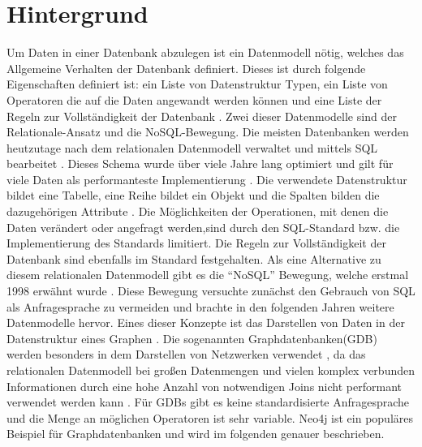
\chapter{Hintergrund} %

\label{Chapter0} %


\newcommand{\keyword}[1]{\textit{#1}}
\newcommand{\tabhead}[1]{\textbf{#1}}
\newcommand{\code}[1]{\texttt{#1}}
\newcommand{\file}[1]{\texttt{\bfseries#1}}
\newcommand{\option}[1]{\texttt{\itshape#1}}

Um Daten in einer Datenbank abzulegen ist ein Datenmodell nötig, welches  das Allgemeine Verhalten der Datenbank definiert. Dieses ist durch folgende Eigenschaften definiert ist: ein Liste von Datenstruktur Typen, ein Liste von Operatoren die auf die Daten angewandt werden können und eine Liste der Regeln zur Vollständigkeit der Datenbank \parencite{codd1981data}. Zwei dieser Datenmodelle sind der Relationale-Ansatz und die NoSQL-Bewegung. Die meisten Datenbanken werden heutzutage nach dem relationalen Datenmodell verwaltet und mittels SQL bearbeitet \parencite{miller2013graph}. Dieses Schema wurde über viele Jahre lang optimiert und gilt für viele Daten als performanteste Implementierung \parencite{miller2013graph}. Die verwendete Datenstruktur bildet eine Tabelle, eine Reihe bildet ein Objekt und die Spalten bilden die dazugehörigen Attribute \parencite{miller2013graph}. Die Möglichkeiten der Operationen, mit denen die Daten verändert oder angefragt werden,sind durch den SQL-Standard bzw. die Implementierung des  Standards limitiert. Die Regeln zur Vollständigkeit der Datenbank sind ebenfalls im Standard festgehalten.  Als eine Alternative zu diesem relationalen Datenmodell gibt es die “NoSQL” Bewegung, welche erstmal 1998 erwähnt wurde \parencite{strauch2011nosql}. Diese Bewegung versuchte zunächst den Gebrauch von SQL als Anfragesprache zu vermeiden und brachte in den folgenden Jahren weitere Datenmodelle hervor. Eines dieser Konzepte ist das Darstellen von Daten in der Datenstruktur eines Graphen \parencite{miller2013graph}. Die sogenannten Graphdatenbanken(GDB) werden besonders in dem Darstellen von Netzwerken verwendet \parencite{han2011survey}, da das relationalen Datenmodell bei großen Datenmengen und vielen komplex verbunden Informationen durch eine hohe Anzahl von notwendigen Joins nicht performant verwendet werden kann \parencite{miller2013graph}. Für GDBs gibt es keine standardisierte Anfragesprache und  die Menge an möglichen Operatoren ist sehr variable. Neo4j ist ein populäres Beispiel für Graphdatenbanken und wird im folgenden genauer beschrieben.

